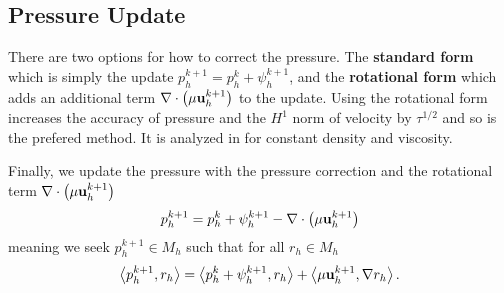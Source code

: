 \documentclass[letterpaper]{erdc}
\begin{document}
\subsection{Pressure Update}\label{sec:bdf2pressureupdate}
\begin{remark}
  There are two options for how to correct the pressure.  The \textbf{standard form} which is simply the update $p_h^{k+1} = p_h^{k} + \psi_h^{k+1}$, and the \textbf{rotational form} which adds an additional term $\nabla\cdot\left(\mu\textbf{u}^{k+1}_h\right)$ to the update.  Using the rotational form increases the accuracy of pressure and the $H^1$ norm of velocity by $\tau^{1/2}$ and so is the prefered method.  It is analyzed in \cite{guermond2004error} for constant density and viscosity.
\end{remark}
Finally, we update the pressure with the pressure correction and the rotational term $\nabla\cdot\left(\mu\textbf{u}^{k+1}_h\right)$
\begin{equation}
  p_h^{k+1} = p_h^{k} + \psi_h^{k+1} - \nabla\cdot\left(\mu\textbf{u}^{k+1}_h\right)
\end{equation}
meaning we seek $p_h^{k+1}\in M_h$ such that for all $r_h\in M_h$
\begin{equation}
  \left\langle p_h^{k+1}, r_h \right\rangle = \left\langle p_h^{k} + \psi_h^{k+1}, r_h \right\rangle + \left\langle \mu\textbf{u}_h^{k+1}, \nabla r_h \right\rangle.
\end{equation}
\end{document}
